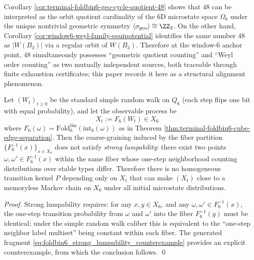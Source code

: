 \begin{remark}\label{rem:terminal-foldbin6-geo-quotient-weyl-shadow}
Corollary \ref{cor:terminal-foldbin6-geo-cycle-quotient-48} shows that \(48\) can be interpreted as the orbit quotient cardinality of the 6D microstate space \(\Omega_6\) under the unique nontrivial geometric symmetry \(\langle\sigma_{\mathrm{geo}}\rangle\cong\ZZ_2\).
On the other hand, Corollary \ref{cor:window6-weyl-family-equipotential} identifies the same number \(48\) as \(|W(B_3)|\) via a regular orbit of \(W(B_3)\).
Therefore at the window-\(6\) anchor point, \(48\) simultaneously possesses ``geometric quotient counting'' and ``Weyl order counting'' as two mutually independent sources, both traceable through finite exhaustion certificates; this paper records it here as a structural alignment phenomenon.
\end{remark}

\begin{proposition}\label{prop:terminal-foldbin6-strong-lumpability-fails}
Let \((W_t)_{t\ge 0}\) be the standard simple random walk on \(Q_6\) (each step flips one bit with equal probability), and let the observable process be
\[
X_t:=F_6(W_t)\in X_6
\]
where \(F_6(\omega)=\mathrm{Fold}^{\mathrm{bin}}_6(\mathrm{int}_6(\omega))\) as in Theorem \ref{thm:terminal-foldbin6-cube-edge-separation}.
Then the coarse-graining induced by the fiber partition \(\{F_6^{-1}(x)\}_{x\in X_6}\) does not satisfy \emph{strong lumpability}:
there exist two points \(\omega,\omega'\in F_6^{-1}(x)\) within the same fiber whose one-step neighborhood counting distributions over stable types differ.
Therefore there is no homogeneous transition kernel \(P\) depending only on \(X_t\) that can make \((X_t)\) close to a memoryless Markov chain on \(X_6\) under all initial microstate distributions.
\end{proposition}
\begin{proof}
Strong lumpability requires: for any \(x,y\in X_6\), and any \(\omega,\omega'\in F_6^{-1}(x)\), the one-step transition probability from \(\omega\) and \(\omega'\) into the fiber \(F_6^{-1}(y)\) must be identical; under the simple random walk caliber this is equivalent to the ``one-step neighbor label multiset'' being constant within each fiber.
The generated fragment \eqref{eq:foldbin6_strong_lumpability_counterexample} provides an explicit counterexample, from which the conclusion follows. \qed
\end{proof}


